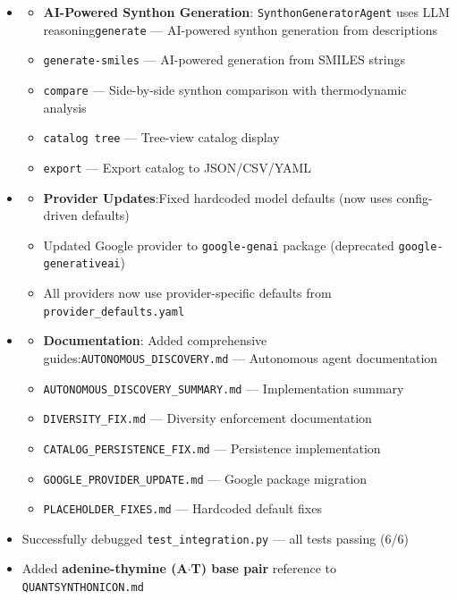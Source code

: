 \documentclass[12pt,a4paper]{article}
\begin{document}
\begin{itemize}
\begin{itemize}
    \item 
    \begin{itemize}
    \item \textbf{AI-Powered Synthon Generation}: \texttt{SynthonGeneratorAgent} uses LLM reasoning\texttt{generate} --- AI-powered synthon generation from descriptions
    \item \texttt{generate-smiles} --- AI-powered generation from SMILES strings
    \item \texttt{compare} --- Side-by-side synthon comparison with thermodynamic analysis
    \item \texttt{catalog tree} --- Tree-view catalog display
    \item \texttt{export} --- Export catalog to JSON/CSV/YAML
\end{itemize}

    \item 
    \begin{itemize}
    \item \textbf{Provider Updates}:Fixed hardcoded model defaults (now uses config-driven defaults)
    \item Updated Google provider to \texttt{google-genai} package (deprecated \texttt{google-generativeai})
    \item All providers now use provider-specific defaults from \texttt{provider\_defaults.yaml}
\end{itemize}

    \item 
    \begin{itemize}
    \item \textbf{Documentation}: Added comprehensive guides:\texttt{AUTONOMOUS\_DISCOVERY.md} --- Autonomous agent documentation
    \item \texttt{AUTONOMOUS\_DISCOVERY\_SUMMARY.md} --- Implementation summary
    \item \texttt{DIVERSITY\_FIX.md} --- Diversity enforcement documentation
    \item \texttt{CATALOG\_PERSISTENCE\_FIX.md} --- Persistence implementation
    \item \texttt{GOOGLE\_PROVIDER\_UPDATE.md} --- Google package migration
    \item \texttt{PLACEHOLDER\_FIXES.md} --- Hardcoded default fixes
\end{itemize}

    \item Successfully debugged \texttt{test\_integration.py} --- all tests passing (6/6)
    \item Added \textbf{adenine-thymine (A$\cdot$T) base pair} reference to \texttt{QUANTSYNTHONICON.md}
\end{itemize}


\end{itemize}
\end{document}
